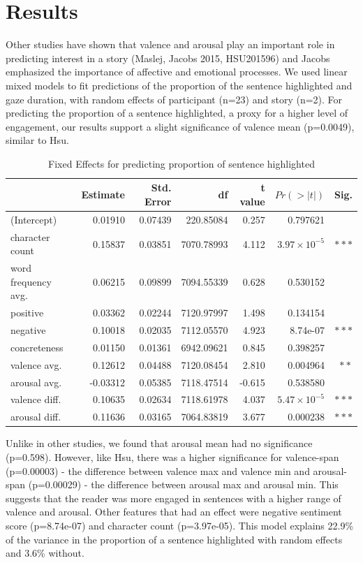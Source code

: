 \documentclass[11pt]{article}
\begin{document}
\section{Results}

Other studies have shown that valence and arousal play an important role in predicting interest in a story (Maslej, Jacobs 2015, HSU201596) and Jacobs emphasized the importance of affective and emotional processes. We used linear mixed models to fit predictions of the proportion of the sentence highlighted and gaze duration, with random effects of participant (n=23) and story (n=2). For predicting the proportion of a sentence highlighted, a proxy for a higher level of engagement, our results support a slight significance of valence mean (p=0.0049), similar to Hsu.

\begin{table}[t]
  \centering
  \begin{tabular}{|l|r|r|r|r|r|r|}
  \hline
   & Estimate & Std. Error & df & t value & $Pr(>|t|)$ & Sig. \\
  \hline
  (Intercept) & 0.01910 & 0.07439 & 220.85084 & 0.257 & 0.797621 & \\
  character count & 0.15837 & 0.03851 & 7070.78993 & 4.112 & $3.97 \times 10^{-5}$ & $\ast\ast\ast$ \\
  word frequency avg. & 0.06215 & 0.09899 & 7094.55339 & 0.628 & 0.530152 & \\
  positive & 0.03362 & 0.02244 & 7120.97997 & 1.498 & 0.134154 & \\
  negative & 0.10018 & 0.02035 & 7112.05570 & 4.923 & 8.74e-07 & $\ast\ast\ast$ \\
  concreteness & 0.01150 & 0.01361 & 6942.09621 & 0.845 & 0.398257 & \\
  valence avg. & 0.12612 & 0.04488 & 7120.08454 & 2.810 & 0.004964 & $\ast\ast$ \\
  arousal avg. & -0.03312 & 0.05385 & 7118.47514 & -0.615 & 0.538580 & \\
  valence diff. & 0.10635 & 0.02634 & 7118.61978 & 4.037 & $5.47 \times 10^{-5}$ & $\ast\ast\ast$ \\
  arousal diff. & 0.11636 & 0.03165 & 7064.83819 & 3.677 & 0.000238 & $\ast\ast\ast$ \\
  \hline
\end{tabular}
\caption{Fixed Effects for predicting proportion of sentence highlighted}
\label{tab:second}
\end{table}

Unlike in other studies, we found that arousal mean had no significance (p=0.598).  However, like Hsu, there was a higher significance for valence-span (p=0.00003) - the difference between valence max and valence min and arousal-span (p=0.00029) - the difference between arousal max and arousal min. This suggests that the reader was more engaged in sentences with a higher range of valence and arousal. Other features that had an effect were negative sentiment score (p=8.74e-07) and character count (p=3.97e-05). This model explains 22.9\% of the variance in the proportion of a sentence highlighted with random effects and 3.6\% without.
\end{document}
